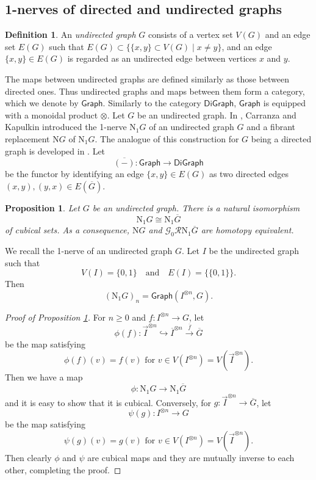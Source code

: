 \documentclass[oneside, 12pt]{amsart}
\numberwithin{equation}{section}
\theoremstyle{plain}
\newtheorem{proposition}[theorem]{Proposition}
\theoremstyle{definition}
\newtheorem{definition}[theorem]{Definition}
\theoremstyle{remark}
\begin{document}
	\subsection{1-nerves of directed and undirected graphs}
	\begin{definition}
		An \emph{undirected graph} $G$ consists of a vertex set $V(G)$ and an edge set $E(G)$ such that $E(G)\subset\{\{x,y\}\subset V(G)\mid x\ne y\}$, and an edge $\{x,y\}\in E(G)$ is regarded as an undirected edge between vertices $x$ and $y$.
	\end{definition}
	The maps between undirected graphs are defined similarly as those between directed ones. Thus undirected graphs and maps between them form a category, which we denote by $\mathsf{Graph}$. Similarly to the category $\mathsf{DiGraph}$, $\mathsf{Graph}$ is equipped with a monoidal product $\otimes$. Let $G$ be an undirected graph. In \cite{CK2}, Carranza and Kapulkin introduced the 1-nerve $\mathrm{N}_1G$ of an undirected graph $G$ and a fibrant replacement $\mathrm{N}G$ of $\mathrm{N}_1G$.
	The analogue of this construction for $G$ being a directed graph is developed in \cite{EIXYZ}. Let
	\[
	\overline{(-)}\colon\mathsf{Graph}\to\mathsf{DiGraph}
	\]
	be the functor by identifying an edge $\{x,y\}\in E(G)$ as two directed edges $(x,y),(y,x)\in E(\overline{G})$.
	\begin{proposition}
		\label{nerve comparison}
		Let $G$ be an undirected graph. There is a natural isomorphism
		\[
		\mathrm{N}_1G\cong\mathrm{N}_{1}\overline{G}
		\]
		of cubical sets. As a consequence, $\mathrm{N}G$ and $\mathcal{G}_0\mathcal{R}\mathrm{N}_1\overline{G}$ are homotopy equivalent.
	\end{proposition}
	We recall the 1-nerve of an undirected graph $G$. Let $I$ be the undirected graph such that
	\[
	V(I)=\{0,1\}\quad\text{and}\quad E(I)=\{\{0,1\}\}.
	\]
	Then
	\[
	\left(\mathrm{N}_1G\right)_n=\mathsf{Graph}(I^{\otimes n},G).
	\]
	\begin{proof}
		[Proof of Proposition \ref{nerve comparison}]
		For $n\ge 0$ and $f\colon I^{\otimes n}\to G$, let
		\[
		\phi(f)\colon\vec{I}^{\otimes n}\hookrightarrow \overline{I}^{\otimes n}\stackrel{\overline{f}}{\longrightarrow}\overline{G}
		\]
		be the map satisfying
		\[
		\phi(f)(v)=f(v)\text{ for }v\in V\left(I^{\otimes n}\right)=V\left(\vec{I}^{\otimes n}\right).
		\]
		Then we have a map
		\[
		\phi\colon\mathrm{N}_1G\to\mathrm{N}_1\overline{G}
		\]
		and it is easy to show that it is cubical. Conversely, for $g\colon\vec{I}^{\otimes n}\to \overline{G}$, let
		\[
		\psi(g)\colon I^{\otimes n}\to G
		\]
		be the map satisfying
		\[
		\psi(g)(v)=g(v)\text{ for }v\in V\left(I^{\otimes n}\right)=V\left(\vec{I}^{\otimes n}\right).
		\]
		Then clearly $\phi$ and $\psi$ are cubical maps and they are mutually inverse to each other, completing the proof.
	\end{proof}
\end{document}
